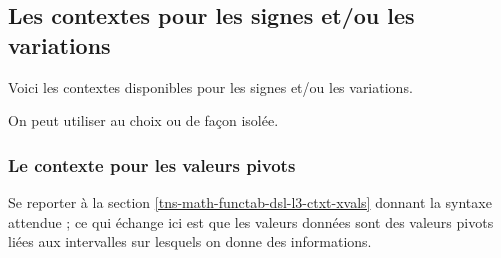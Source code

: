 \documentclass{tutodoc}
\begin{document}

\subsection{Les contextes pour les signes et/ou les variations}

Voici les contextes disponibles pour les signes et/ou les variations.

\medskip

\begin{itemize*}[before = \leavevmode\kern15pt, itemjoin = \kern15pt]
	\item {}

	\item {}

	\item {}
\end{itemize*}


\begin{tdocnote}
	On peut utiliser au choix  ou  de façon isolée.
\end{tdocnote}




\subsubsection{Le contexte  pour les valeurs pivots}

Se reporter à la section \ref{tns-math-functab-dsl-l3-ctxt-xvals} donnant la syntaxe attendue ; ce qui échange ici est que les valeurs données sont des valeurs pivots liées aux intervalles sur lesquels on donne des informations.
\end{document}
